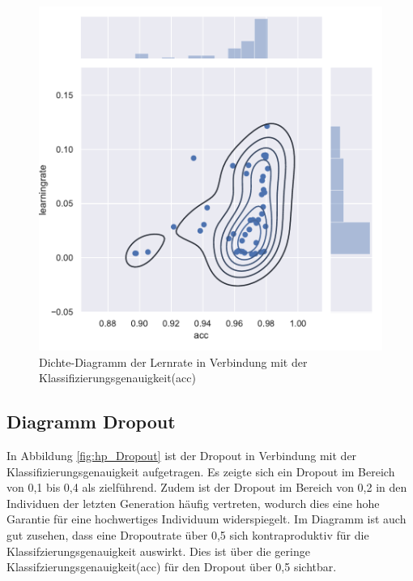 \begin{figure}[H]
  \centering  
  \includegraphics[scale=0.9]{img/hp_learningrate.pdf}
  \caption{Dichte-Diagramm der Lernrate in Verbindung mit der Klassifizierungsgenauigkeit(acc)}
  \label{fig:hp_learningrate}
\end{figure}

\subsection{Diagramm Dropout}
In Abbildung \ref{fig:hp_Dropout} ist der Dropout in Verbindung mit der Klassifizierungsgenauigkeit aufgetragen. Es zeigte sich ein Dropout im Bereich von 0,1 bis 0,4 als zielführend. Zudem ist der Dropout im Bereich von 0,2 in den Individuen der letzten Generation häufig vertreten, wodurch dies eine hohe Garantie für eine hochwertiges Individuum widerspiegelt. Im Diagramm ist auch gut zusehen, dass eine Dropoutrate über 0,5 sich kontraproduktiv für die Klassifzierungsgenauigkeit auswirkt. Dies ist über die geringe Klassifzierungsgenauigkeit(acc) für den Dropout über 0,5 sichtbar.

